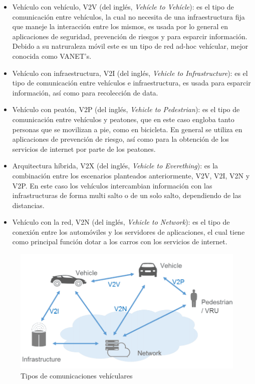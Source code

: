\begin{itemize}
	\item Vehículo con vehículo, V2V (del inglés, \textit{Vehícle to Vehícle}): es el tipo de comunicación entre vehículos, la cual no necesita de una infraestructura fija que maneje la interacción entre los mismos, es usada por lo general en aplicaciones de seguridad, prevención de riesgos y para esparcir información. Debido a su natruraleza móvil este es un tipo de red ad-hoc vehícular, mejor conocida como VANET's.
	\item Vehículo con infraestructura, V2I (del inglés, \textit{Vehicle to Infrastructure}): es el tipo de comunicación entre vehículos e infraestructura, es usada para esparcir información, así como para recolección de data.
	\item Vehículo con peatón, V2P (del inglés, \textit{Vehicle to Pedestrian}): es el tipo de comunicación entre vehículos y peatones, que en este caso engloba tanto personas que se movilizan a pie, como en bicicleta. En general se utiliza en aplicaciones de prevención de riesgo, así como para la obtención de los servicios de internet por parte de los peatones.
	\item Arquitectura híbrida, V2X (del inglés, \textit{Vehicle to Everething}): es la combinación entre los escenarios planteados anteriormente, V2V, V2I, V2N y V2P. En este caso los vehículos intercambian información con las infrastructuras de forma multi salto o de un solo salto, dependiendo de las distancias.
	\item Vehículo con la red, V2N (del inglés, \textit{Vehicle to Network}): es el tipo de conexión entre los automóviles y los servidores de aplicaciones, el cual tiene como principal función dotar a los carros con los servicios de internet.
\end{itemize}

\begin{figure}[!h]
	\centering
		\includegraphics[scale=0.4]{Imagenes/v2x}
		\caption[Tipos de comunicaciones vehículares, for L0F]{Tipos de comunicaciones vehículares \protect\footnotemark}
		\label{fig:v2x}
	\end{figure}	


